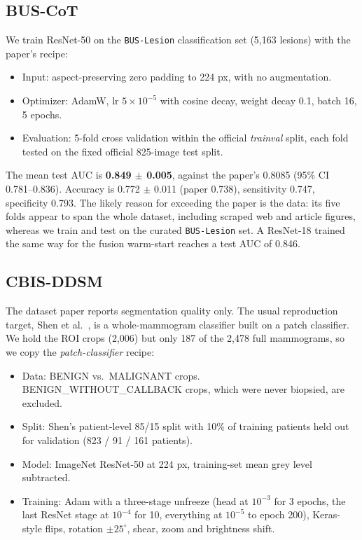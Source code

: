 \documentclass[11pt]{article}
\begin{document}
\subsection{BUS-CoT}

We train ResNet-50 on the \texttt{BUS-Lesion} classification set (5,163
lesions) with the paper's recipe:
\begin{itemize}
  \item Input: aspect-preserving zero padding to 224 px, with no augmentation.
  \item Optimizer: AdamW, lr $5\times10^{-5}$ with cosine decay, weight decay
    0.1, batch 16, 5 epochs.
  \item Evaluation: 5-fold cross validation within the official
    \emph{trainval} split, each fold tested on the fixed official 825-image
    test split.
\end{itemize}
The mean test AUC is \textbf{0.849 $\pm$ 0.005}, against the paper's
0.8085 (95\% CI 0.781--0.836). Accuracy is 0.772 $\pm$ 0.011 (paper 0.738),
sensitivity 0.747, specificity 0.793. The likely reason for exceeding the
paper is the data: its five folds appear to span the whole dataset, including
scraped web and article figures, whereas we train and test on the curated
\texttt{BUS-Lesion} set. A ResNet-18 trained the same way for the fusion
warm-start reaches a test AUC of 0.846.

\subsection{CBIS-DDSM}

The dataset paper reports segmentation quality only. The usual reproduction
target, Shen et al.\ \citep{shen2019endtoend}, is a whole-mammogram classifier
built on a patch classifier. We hold the ROI crops (2,006) but only 187 of the
2,478 full mammograms, so we copy the \emph{patch-classifier} recipe:
\begin{itemize}
  \item Data: BENIGN vs.\ MALIGNANT crops. BENIGN\_WITHOUT\_CALLBACK crops,
    which were never biopsied, are excluded.
  \item Split: Shen's patient-level 85/15 split with 10\% of training patients
    held out for validation (823 / 91 / 161 patients).
  \item Model: ImageNet ResNet-50 at 224 px, training-set mean grey level
    subtracted.
  \item Training: Adam with a three-stage unfreeze (head at $10^{-3}$ for 3
    epochs, the last ResNet stage at $10^{-4}$ for 10, everything at
    $10^{-5}$ to epoch 200), Keras-style flips, rotation $\pm25^\circ$,
    shear, zoom and brightness shift.
\end{itemize}
\end{document}
